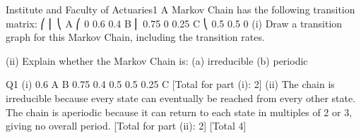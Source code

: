 \documentclass[a4paper,12pt]{article}
\begin{document}
 Institute and Faculty of Actuaries1
A Markov Chain has the following transition matrix:
⎛
⎜
⎝
A ⎛ 0 0.6 0.4
B ⎜ 0.75 0 0.25
C ⎝ 0.5 0.5 0
(i)
Draw a transition graph for this Markov Chain, including the transition rates.

(ii)
Explain whether the Markov Chain is:
(a)
irreducible
(b)
periodic




Q1
(i)
0.6
A
B
0.75
0.4
0.5
0.5
0.25
C
[Total for part (i): 2]
(ii)
The chain is irreducible 
because every state can eventually be reached from every other state. 
The chain is aperiodic 
because it can return to each state in multiples of 2 or 3, giving no overall
period. 
[Total for part (ii): 2]
[Total 4]

\end{document}
